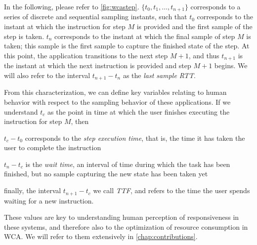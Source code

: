 In the following, please refer to \cref{fig:wcastep}.
\ensuremath{\{ t_0, t_1, \ldots, t_{n + 1} \}} corresponds to a series of discrete and sequential sampling instants, such that \ensuremath{t_0} corresponds to the instant at which the instruction for step \ensuremath{M} is provided and the first sample of the step is taken.
\ensuremath{t_n} corresponds to the instant at which the final sample of step \ensuremath{M} is taken;
this sample is the first sample to capture the finished state of the step.
At this point, the application transitions to the next step \ensuremath{M + 1}, and thus \ensuremath{t_{n + 1}} is the instant at which the next instruction is provided and step \ensuremath{M + 1} begins.
We will also refer to the interval \ensuremath{t_{n + 1} - t_n} as the \emph{last sample \gls{RTT}}.

%
From this characterization, we can define key variables relating to human behavior with respect to the sampling behavior of these applications.
If we understand \ensuremath{t_c} as the point in time at which the user finishes executing the instruction for step \ensuremath{M}, then
\begin{enumerate*}[itemjoin={{; }}, itemjoin*={{; and }}, label={(\arabic*)}]
    \item \ensuremath{t_c - t_0} corresponds to the \emph{step execution time}, that is, the time it has taken the user to complete the instruction
    \item \ensuremath{t_n - t_c} is the \emph{wait time}, an interval of time during which the task has been finished, but no sample capturing the new state has been taken yet
    \item finally, the interval \ensuremath{t_{n + 1} - t_c} we call \emph{\gls{TTF}}, and refers to the time the user spends waiting for a new instruction.
\end{enumerate*}
These values are key to understanding human perception of responsiveness in these systems, and therefore also to the optimization of resource consumption in \gls{WCA}.
We will refer to them extensively in \cref{chap:contributions}.

